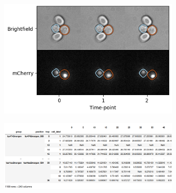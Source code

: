 \begin{figure}[hp]
  \centering
  \begin{subfigure}[htpb]{0.6\textwidth}
   \centering
   \includegraphics[width=\textwidth]{example_images_mCherry_edit.png}
   \caption{
   }
   \label{fig:methods-timelapse-images}
  \end{subfigure}

  \begin{subfigure}[htpb]{1.0\textwidth}
   \centering
   \includegraphics[width=\textwidth]{example_dataframe.png}
   \caption{
   }
   \label{fig:methods-timelapse-dataframe}
  \end{subfigure}


\end{figure}
